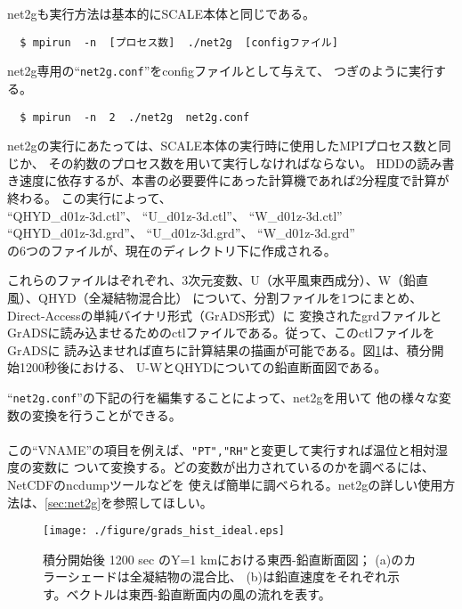 net2gも実行方法は基本的にSCALE本体と同じである。
\begin{verbatim}
  $ mpirun  -n  [プロセス数]  ./net2g  [configファイル]
\end{verbatim}
net2g専用の``\verb|net2g.conf|''をconfigファイルとして与えて、
つぎのように実行する。
\begin{verbatim}
  $ mpirun  -n  2  ./net2g  net2g.conf
\end{verbatim}

\noindent net2gの実行にあたっては、SCALE本体の実行時に使用したMPIプロセス数と同じか、
その約数のプロセス数を用いて実行しなければならない。
HDDの読み書き速度に依存するが、本書の必要要件にあった計算機であれば2分程度で計算が終わる。
この実行によって、\\
``QHYD\_d01z-3d.ctl''、 ``U\_d01z-3d.ctl''、 ``W\_d01z-3d.ctl''\\
``QHYD\_d01z-3d.grd''、 ``U\_d01z-3d.grd''、 ``W\_d01z-3d.grd''\\
の6つのファイルが、現在のディレクトリ下に作成される。

これらのファイルはぞれぞれ、3次元変数、U（水平風東西成分）、W（鉛直風）、QHYD（全凝結物混合比）
について、分割ファイルを1つにまとめ、Direct-Accessの単純バイナリ形式（GrADS形式）に
変換されたgrdファイルとGrADSに読み込ませるためのctlファイルである。従って、このctlファイルをGrADSに
読み込ませれば直ちに計算結果の描画が可能である。図\ref{fig_ideal}は、積分開始1200秒後における、
U-WとQHYDについての鉛直断面図である。


``\verb|net2g.conf|''の下記の行を編集することによって、net2gを用いて
他の様々な変数の変換を行うことができる。\\

\\

\noindent この``VNAME''の項目を例えば、\verb|"PT","RH"|と変更して実行すれば温位と相対湿度の変数に
ついて変換する。どの変数が出力されているのかを調べるには、NetCDFのncdumpツールなどを
使えば簡単に調べられる。net2gの詳しい使用方法は、\ref{sec:net2g}を参照してほしい。


\begin{figure}[t]
\begin{center}
  \texttt{[image: ./figure/grads\_hist\_ideal.eps]}\\
  \caption{積分開始後 1200 sec のY=1 kmにおける東西-鉛直断面図；
           (a)のカラーシェードは全凝結物の混合比、
           (b)は鉛直速度をそれぞれ示す。ベクトルは東西-鉛直断面内の風の流れを表す。}
  \label{fig_ideal}
\end{center}
\end{figure}

